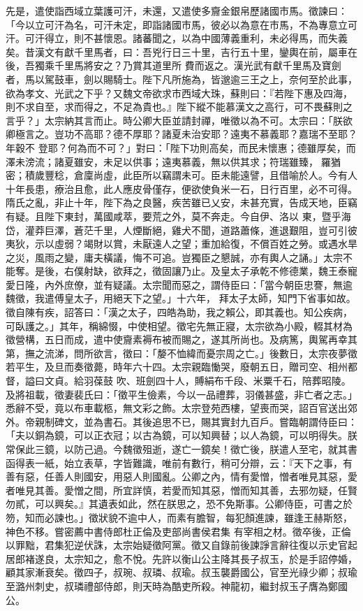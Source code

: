 \begin{pinyinscope}
 先是，遣使詣西域立葉護可汗，未還，又遣使多齎金銀帛歷諸國市馬。徵諫曰：「今以立可汗為名，可汗未定，即詣諸國市馬，彼必以為意在市馬，不為專意立可汗。可汗得立，則不甚懷恩。諸蕃聞之，以為中國薄義重利，未必得馬，而失義矣。昔漢文有獻千里馬者，曰：吾兇行日三十里，吉行五十里，鑾輿在前，屬車在後，吾獨乘千里馬將安之？乃賞其道里所
 費而返之。漢光武有獻千里馬及寶劍者，馬以駕鼓車，劍以賜騎士。陛下凡所施為，皆邈逾三王之上，奈何至於此事，欲為孝文、光武之下乎？又魏文帝欲求市西域大珠，蘇則曰：『若陛下惠及四海，則不求自至，求而得之，不足為貴也。』陛下縱不能慕漢文之高行，可不畏蘇則之言乎？」太宗納其言而止。時公卿大臣並請封禪，唯徵以為不可。太宗曰：「朕欲卿極言之。豈功不高耶？德不厚耶？諸夏未治安耶？遠夷不慕義耶？嘉瑞不至耶？年穀不
 登耶？何為而不可？」對曰：「陛下功則高矣，而民未懷惠；德雖厚矣，而澤未滂流；諸夏雖安，未足以供事；遠夷慕義，無以供其求；符瑞雖臻，羅猶密；積歲豐稔，倉廩尚虛，此臣所以竊謂未可。臣未能遠譬，且借喻於人。今有人十年長患，療治且愈，此人應皮骨僅存，便欲使負米一石，日行百里，必不可得。隋氏之亂，非止十年，陛下為之良醫，疾苦雖已乂安，未甚充實，告成天地，臣竊有疑。且陛下東封，萬國咸萃，要荒之外，莫不奔走。今自伊、洛以
 東，暨乎海岱，灌莽巨澤，蒼茫千里，人煙斷絕，雞犬不聞，道路蕭條，進退艱阻，豈可引彼夷狄，示以虛弱？竭財以賞，未厭遠人之望；重加給復，不償百姓之勞。或遇水旱之災，風雨之變，庸夫橫議，悔不可追。豈獨臣之懇誠，亦有輿人之誦。」太宗不能奪。是後，右僕射缺，欲拜之，徵固讓乃止。及皇太子承乾不修德業，魏王泰寵愛日隆，內外庶僚，並有疑議。太宗聞而惡之，謂侍臣曰：「當今朝臣忠謇，無逾魏徵，我遣傅皇太子，用絕天下之望。」十六年，
 拜太子太師，知門下省事如故。徵自陳有疾，詔答曰：「漢之太子，四皓為助，我之賴公，即其義也。知公疾病，可臥護之。」其年，稱綿惙，中使相望。徵宅先無正寢，太宗欲為小殿，輟其材為徵營構，五日而成，遣中使齎素褥布被而賜之，遂其所尚也。及病篤，輿駕再幸其第，撫之流涕，問所欲言，徵曰：「嫠不恤緯而憂宗周之亡。」後數日，太宗夜夢徵若平生，及旦而奏徵薨，時年六十四。太宗親臨慟哭，廢朝五日，贈司空、相州都督，謚曰文貞。給羽葆鼓
 吹、班劍四十人，賻絹布千段、米粟千石，陪葬昭陵。及將祖載，徵妻裴氏曰：「徵平生儉素，今以一品禮葬，羽儀甚盛，非亡者之志。」悉辭不受，竟以布車載柩，無文彩之飾。太宗登苑西樓，望喪而哭，詔百官送出郊外。帝親制碑文，並為書石。其後追思不已，賜其實封九百戶。嘗臨朝謂侍臣曰：「夫以銅為鏡，可以正衣冠；以古為鏡，可以知興替；以人為鏡，可以明得失。朕常保此三鏡，以防己過。今魏徵殂逝，遂亡一鏡矣！徵亡後，朕遣人至宅，就其書
 函得表一紙，始立表草，字皆難識，唯前有數行，稍可分辯，云：『天下之事，有善有惡，任善人則國安，用惡人則國亂。公卿之內，情有愛憎，憎者唯見其惡，愛者唯見其善。愛憎之間，所宜詳慎，若愛而知其惡，憎而知其善，去邪勿疑，任賢勿貳，可以興矣。』其遺表如此，然在朕思之，恐不免斯事。公卿侍臣，可書之於笏，知而必諫也。」徵狀貌不逾中人，而素有膽智，每犯顏進諫，雖逢王赫斯怒，神色不移。嘗密薦中書侍郎杜正倫及吏部尚書侯君集
 有宰相之材。徵卒後，正倫以罪黜，君集犯逆伏誅，太宗始疑徵阿黨。徵又自錄前後諫諍言辭往復以示史官起居郎褚遂良，太宗知之，愈不悅。先許以衡山公主降其長子叔玉，於是手詔停婚，顧其家漸衰矣。徵四子，叔琬、叔璘、叔瑜。叔玉襲爵國公，官至光祿少卿；叔瑜至潞州刺史，叔璘禮部侍郎，則天時為酷吏所殺。神龍初，繼封叔玉子膺為鄭國公。




\end{pinyinscope}

